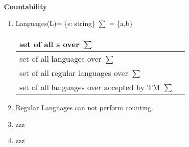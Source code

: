 
\centerline{\textbf{ \LARGE  Countability }}

\begin{enumerate}
    \item Languages(L)= \{s: string\} \(\sum\) = \{a,b\}

    \begin{myTableStyle} \begin{tabular}{ |m{8cm}|m{4cm}| } \hline
        set of all s over \(\sum\) &   \\ \hline
        set of all languages over \(\sum\) &   \\ \hline
        set of all regular languages over \(\sum\) &   \\ \hline
        set of all languages over accepted by TM \(\sum\) &   \\ \hline
    \end{tabular} \end{myTableStyle} \vspace{0.08in}
    \item Regular Languages can not perform counting.
    \item zzz
    \item zzz
\end{enumerate}



